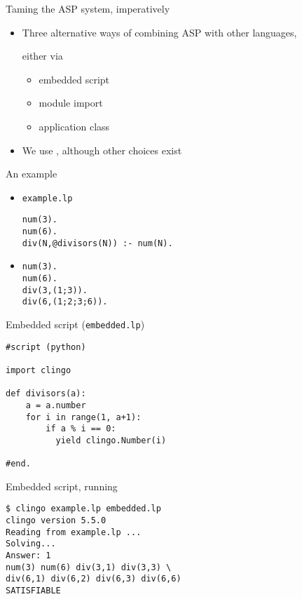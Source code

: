 \begin{frame}{Taming the ASP system, imperatively}
  \bigskip
  \begin{itemize}
  \item Three alternative ways of combining ASP with other languages,

    either via
    \begin{itemize}\normalsize
    \item embedded script
    \item module import
    \item application class
    \end{itemize}
    \bigskip
  \item We use \python, although other choices exist
  \end{itemize}
\end{frame}
\begin{frame}[fragile]{An example}
  \bigskip
  \begin{itemize}
  \item<1->   \texttt{example.lp}
\begin{lstlisting}
num(3).
num(6).
div(N,@divisors(N)) :- num(N).
\end{lstlisting}
  \bigskip
  \item<2-> 
\begin{lstlisting}
num(3).
num(6).
div(3,(1;3)).
div(6,(1;2;3;6)).
\end{lstlisting}
  \end{itemize}
\end{frame}
\begin{frame}[fragile]{Embedded script (\texttt{embedded.lp})}
  \bigskip
\begin{lstlisting}
#script (python)

import clingo

def divisors(a):
    a = a.number
    for i in range(1, a+1):
        if a % i == 0:
          yield clingo.Number(i)

#end.
\end{lstlisting}
\end{frame}
\begin{frame}[fragile]{Embedded script, running}
  \bigskip
\begin{lstlisting}
$ clingo example.lp embedded.lp
clingo version 5.5.0
Reading from example.lp ...
Solving...
Answer: 1
num(3) num(6) div(3,1) div(3,3) \
div(6,1) div(6,2) div(6,3) div(6,6)
SATISFIABLE
\end{lstlisting}
\end{frame}
